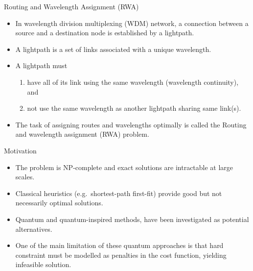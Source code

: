 \begin{frame}{Routing and Wavelength Assignment (RWA)}
    \begin{itemize}
        \item In wavelength division multiplexing (WDM) network, a connection between a source and a destination node is established by a lightpath.
        \item A lightpath is a set of links associated with a unique wavelength.
        \item A lightpath must \begin{enumerate}
                \item have all of its link using the same wavelength (wavelength continuity), and
                \item not use the same wavelength as another lightpath sharing same link(s).
            \end{enumerate}
        \item The task of assigning routes and wavelengths optimally is called the Routing and wavelength assignment (RWA) problem\cite{Birman515906}.

    \end{itemize}
\end{frame}
\begin{frame}{Motivation}
    \begin{itemize}
        \item The problem is NP-complete and exact solutions are intractable at large scales\cite{Chlamtac101539, Birman515906, Bala147477}.
        \item Classical heuristics (e.g.\ shortest-path first-fit) provide good but not necessarily optimal solutions\cite{Chlamtac101539, Birman515906, Bala147477, Subramaniam605312, Gibong497889, Karasan664267, Barry719747}.
        \item Quantum and quantum-inspired methods, have been investigated as potential alternatives\cite{Seker01022024, boev2023}.
        \item One of the main limitation of these quantum approaches is that hard constraint must be modelled as penalties in the cost function, yielding infeasible solution.
    \end{itemize}
\end{frame}
